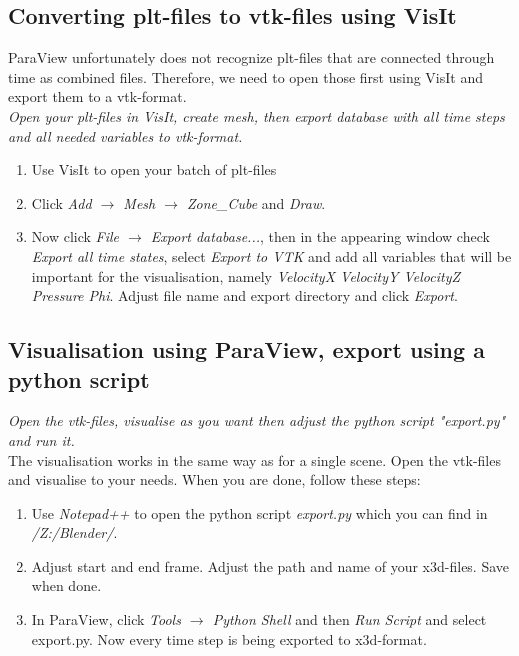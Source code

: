\documentclass[11pt,twoside,a4paper]{fdyartcl}
\theoremstyle{myPlain}
\theoremstyle{myDefinition}
\begin{document}
\subsection{Converting plt-files to vtk-files using VisIt}
ParaView unfortunately does not recognize plt-files that are connected through time as combined files. Therefore, we need to open those first using VisIt and export them to a vtk-format.\\
\textit{Open your plt-files in VisIt, create mesh, then export database with all time steps and all needed variables to vtk-format.}\\
\begin{enumerate}
	\item Use VisIt to open your batch of plt-files
	\item Click \textit{Add $\rightarrow$ Mesh $\rightarrow$ Zone\_Cube} and \textit{Draw}.
	\item Now click \textit{File $\rightarrow$ Export database...}, then in the appearing window check \textit{Export all time states}, select \textit{Export to VTK} and add all variables that will be important for the visualisation, namely \textit{VelocityX VelocityY VelocityZ Pressure Phi}. Adjust file name and export directory and click \textit{Export}. 
\end{enumerate}
\subsection{Visualisation using ParaView, export using a python script}
\textit{Open the vtk-files, visualise as you want then adjust the python script "export.py" and run it.}\\
The visualisation works in the same way as for a single scene. Open the vtk-files and visualise to your needs. When you are done, follow these steps:
\begin{enumerate}
	\item Use \textit{Notepad++} to open the python script \textit{export.py} which you can find in \textit{/Z:/Blender/}.
	\item Adjust start and end frame. Adjust the path and name of your x3d-files. Save when done.
	\item In ParaView, click  \textit{Tools $\rightarrow$ Python Shell} and then \textit{Run Script} and select export.py. Now every time step is being exported to x3d-format.
\end{enumerate}
\end{document}
